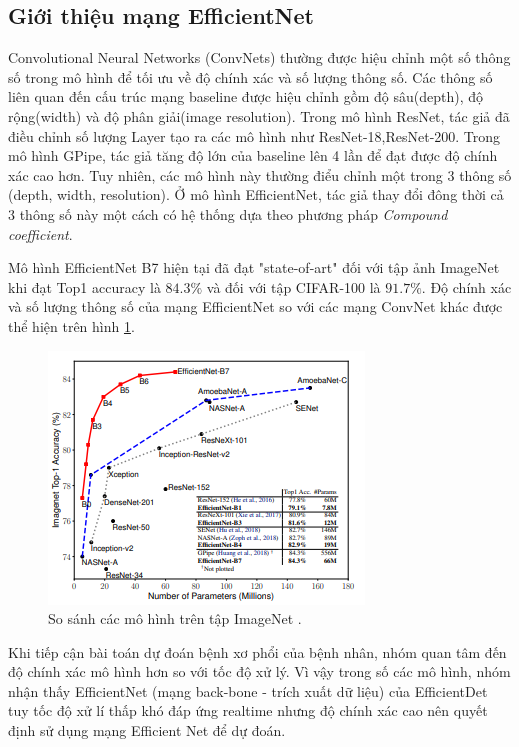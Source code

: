 \subsection{Giới thiệu mạng EfficientNet}
Convolutional Neural Networks (ConvNets) thường được hiệu chỉnh một số thông số trong mô hình để tối ưu về độ chính xác và số lượng thông số. Các thông số liên quan đến cấu trúc mạng baseline được hiệu chỉnh gồm độ sâu(depth), độ rộng(width) và độ phân giải(image resolution). Trong mô hình ResNet, tác giả đã điều chỉnh số lượng Layer tạo ra các mô hình như ResNet-18,ResNet-200. Trong mô hình GPipe, tác giả tăng độ lớn của baseline lên 4 lần để đạt được độ chính xác cao hơn. Tuy nhiên, các mô hình này thường điểu chỉnh một trong 3 thông số (depth, width, resolution). Ở mô hình EfficientNet, tác giả thay đổi đông thời cả 3 thông số này một cách có hệ thống dựa theo phương pháp \textit{Compound coefficient}.\par 
Mô hình EfficientNet B7 hiện tại đã đạt "state-of-art" đối với tập ảnh ImageNet khi đạt Top1 accuracy là $84.3\%$ và đối với tập CIFAR-100 là $91.7\%$. Độ chính xác và số lượng thông số của mạng EfficientNet so với các mạng ConvNet khác được thể hiện trên hình \ref{fig:eff1}.\par
\begin{figure}[ht!]
\centerline{\includegraphics[scale=0.8]{images/eff1.png}}
\caption{So sánh các mô hình trên tập ImageNet \cite{efficientnet:2020}.}
\label{fig:eff1}
\end{figure}
Khi tiếp cận bài toán dự đoán bệnh xơ phổi của bệnh nhân, nhóm quan tâm đến độ chính xác mô hình hơn so với tốc độ xử lý. Vì vậy trong số các mô hình, nhóm nhận thấy EfficientNet (mạng back-bone - trích xuất dữ liệu) của EfficientDet tuy tốc độ xử lí thấp khó đáp ứng realtime nhưng độ chính xác cao nên quyết định sử dụng mạng Efficient Net để dự đoán.\par
